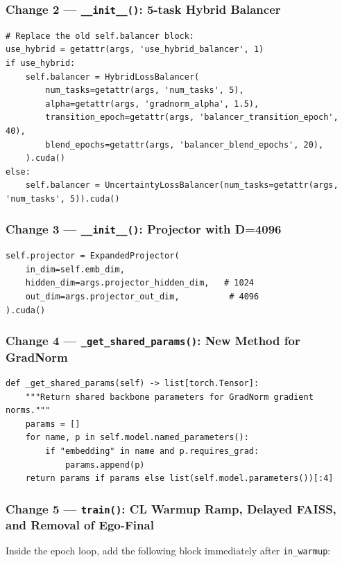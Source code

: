 \documentclass[11pt,a4paper]{article}
\begin{document}
\subsubsection*{Change 2 --- \texttt{\_\_init\_\_()}: 5-task Hybrid Balancer}
\begin{lstlisting}[style=pythonstyle]
# Replace the old self.balancer block:
use_hybrid = getattr(args, 'use_hybrid_balancer', 1)
if use_hybrid:
    self.balancer = HybridLossBalancer(
        num_tasks=getattr(args, 'num_tasks', 5),
        alpha=getattr(args, 'gradnorm_alpha', 1.5),
        transition_epoch=getattr(args, 'balancer_transition_epoch', 40),
        blend_epochs=getattr(args, 'balancer_blend_epochs', 20),
    ).cuda()
else:
    self.balancer = UncertaintyLossBalancer(num_tasks=getattr(args, 'num_tasks', 5)).cuda()
\end{lstlisting}

\subsubsection*{Change 3 --- \texttt{\_\_init\_\_()}: Projector with D=4096}
\begin{lstlisting}[style=pythonstyle]
self.projector = ExpandedProjector(
    in_dim=self.emb_dim,
    hidden_dim=args.projector_hidden_dim,   # 1024
    out_dim=args.projector_out_dim,          # 4096
).cuda()
\end{lstlisting}

\subsubsection*{Change 4 --- \texttt{\_get\_shared\_params()}: New Method for GradNorm}
\begin{lstlisting}[style=pythonstyle]
def _get_shared_params(self) -> list[torch.Tensor]:
    """Return shared backbone parameters for GradNorm gradient norms."""
    params = []
    for name, p in self.model.named_parameters():
        if "embedding" in name and p.requires_grad:
            params.append(p)
    return params if params else list(self.model.parameters())[:4]
\end{lstlisting}

\subsubsection*{Change 5 --- \texttt{train()}: CL Warmup Ramp, Delayed FAISS, and Removal of Ego-Final}
Inside the epoch loop, add the following block immediately after \texttt{in\_warmup}:
\end{document}

